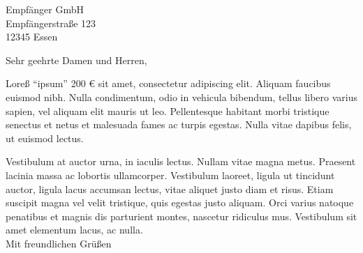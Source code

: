 \documentclass[
    fontsize=12pt,
    parskip=full,
    paper=A4,
    enlargefirstpage=true,
	fromalign=left,
    fromphone=true,
    fromemail=true,
    version=last,
]{scrlttr2}
\begin{document}



\begin{letter}{
    Empfänger GmbH\\
    Empfängerstraße 123\\
    12345 Essen
}

\opening{Sehr geehrte Damen und Herren,}

Loreß "`ipsum"' 200 € sit amet, consectetur adipiscing elit. Aliquam faucibus euismod nibh. Nulla condimentum, odio in vehicula bibendum, tellus libero varius sapien, vel aliquam elit mauris ut leo. Pellentesque habitant morbi tristique senectus et netus et malesuada fames ac turpis egestas. Nulla vitae dapibus felis, ut euismod lectus.
 
Vestibulum at auctor urna, in iaculis lectus. Nullam vitae magna metus. Praesent lacinia massa ac lobortis ullamcorper. Vestibulum laoreet, ligula ut tincidunt auctor, ligula lacus accumsan lectus, vitae aliquet justo diam et risus. Etiam suscipit magna vel velit tristique, quis egestas justo aliquam. Orci varius natoque penatibus et magnis dis parturient montes, nascetur ridiculus mus. Vestibulum sit amet elementum lacus, ac nulla. \\

Mit freundlichen Grüßen




\end{letter}

%
\end{document}
